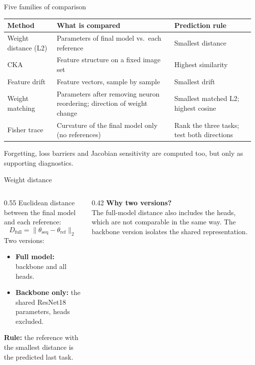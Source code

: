 \documentclass[aspectratio=169,11pt]{beamer}
\begin{document}
\begin{frame}{Five families of comparison}
  \footnotesize
  \centering
  \renewcommand{\arraystretch}{1.15}
  \begin{tabular}{@{}p{3.3cm}p{5.2cm}p{5.0cm}@{}}
    \toprule
    \textbf{Method} & \textbf{What is compared} & \textbf{Prediction rule}\\
    \midrule
    Weight distance (L2) & Parameters of final model vs.\ each reference & Smallest distance\\
    CKA & Feature structure on a fixed image set & Highest similarity\\
    Feature drift & Feature vectors, sample by sample & Smallest drift\\
    Weight matching & Parameters after removing neuron reordering; direction of weight change & Smallest matched L2; highest cosine\\
    Fisher trace & Curvature of the final model only (no references) & Rank the three tasks; test both directions\\
    \bottomrule
  \end{tabular}

  \vspace{2mm}
  \raggedright\small
  Forgetting, loss barriers and Jacobian sensitivity are computed too, but only as supporting diagnostics.
\end{frame}

\begin{frame}{Weight distance}
  \begin{columns}[T]
    \begin{column}{0.55\textwidth}
      Euclidean distance between the final model and each reference:
      \[
        D_{\text{full}} = \lVert \theta_{\text{seq}} - \theta_{\text{ref}} \rVert_2
      \]
      Two versions:
      \begin{itemize}
        \item \textbf{Full model:} backbone and all heads.
        \item \textbf{Backbone only:} the shared ResNet18 parameters, heads excluded.
      \end{itemize}
      \medskip
      \textbf{Rule:} the reference with the smallest distance is the predicted last task.
    \end{column}
    \begin{column}{0.42\textwidth}
      \textbf{Why two versions?}\\[2pt]
      The full-model distance also includes the heads, which are not comparable in the same way. The backbone version isolates the shared representation.
    \end{column}
  \end{columns}
\end{frame}
\end{document}
